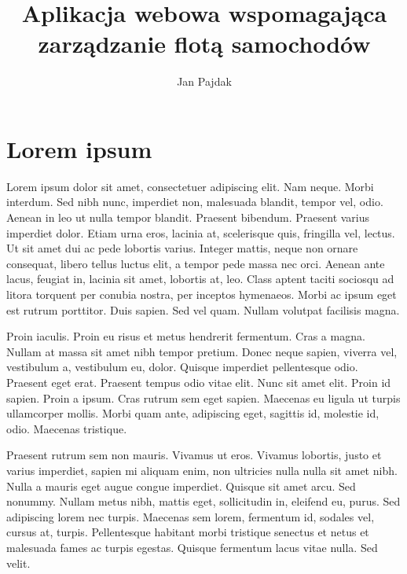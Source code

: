 \documentclass[eng,printmode]{mgr}
\title{Aplikacja webowa wspomagająca zarządzanie flotą samochodów}
\author{Jan Pajdak}
\begin{document}


\maketitle

\tableofcontents 


\chapter{Lorem ipsum}
Lorem ipsum dolor sit amet, consectetuer adipiscing elit. Nam neque. Morbi interdum. Sed nibh nunc, imperdiet non, malesuada blandit, tempor vel, odio. Aenean in leo ut nulla tempor blandit. Praesent bibendum. Praesent varius imperdiet dolor. Etiam urna eros, lacinia at, scelerisque quis, fringilla vel, lectus. Ut sit amet dui ac pede lobortis varius. Integer mattis, neque non ornare consequat, libero tellus luctus elit, a tempor pede massa nec orci. Aenean ante lacus, feugiat in, lacinia sit amet, lobortis at, leo. Class aptent taciti sociosqu ad litora torquent per conubia nostra, per inceptos hymenaeos. Morbi ac ipsum eget est rutrum porttitor. Duis sapien. Sed vel quam. Nullam volutpat facilisis magna. 

Proin iaculis. Proin eu risus et metus hendrerit fermentum. Cras a magna. Nullam at massa sit amet nibh tempor pretium. Donec neque sapien, viverra vel, vestibulum a, vestibulum eu, dolor. Quisque imperdiet pellentesque odio. Praesent eget erat. Praesent tempus odio vitae elit. Nunc sit amet elit. Proin id sapien. Proin a ipsum. Cras rutrum sem eget sapien. Maecenas eu ligula ut turpis ullamcorper mollis. Morbi quam ante, adipiscing eget, sagittis id, molestie id, odio. Maecenas tristique. 

Praesent rutrum sem non mauris. Vivamus ut eros. Vivamus lobortis, justo et varius imperdiet, sapien mi aliquam enim, non ultricies nulla nulla sit amet nibh. Nulla a mauris eget augue congue imperdiet. Quisque sit amet arcu. Sed nonummy. Nullam metus nibh, mattis eget, sollicitudin in, eleifend eu, purus. Sed adipiscing lorem nec turpis. Maecenas sem lorem, fermentum id, sodales vel, cursus at, turpis. Pellentesque habitant morbi tristique senectus et netus et malesuada fames ac turpis egestas. Quisque fermentum lacus vitae nulla. Sed velit. 
\end{document}
